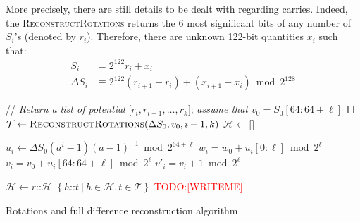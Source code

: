 \documentclass[preprint,svgnames]{iacrtrans}
\newcommand{\todo}[1]{\textcolor{red}{TODO:[#1]}}
\begin{document}
More precisely, there are still details to be dealt with regarding
carries. Indeed, the \textsc{ReconstructRotations} returns the 6 most
significant bits of any number of $S_i$'s (denoted by $r_i$). Therefore, there
are unknown 122-bit quantities $x_i$ such that:
\begin{align*}
  S_i &= 2^{122} r_i + x_i \\
  \Delta S_i &\equiv 2^{122} (r_{i+1} - r_i) + (x_{i+1} - x_{i}) \bmod 2^{128}
\end{align*}


\begin{algorithm}
\begin{algorithmic}[1]
 \State // \emph{Return a list of potential} $\texttt{[}r_i, r_{i+1}, \dots, r_k\texttt{]}$; \emph{assume that $v_0 = S_0[64:64+\ell]$}
  \State \Return \texttt{[]} 
  \EndIf
  \State $\mathcal{T} \gets \Call{ReconstructRotations}{\Delta S_0, v_0, i + 1, k}$ 
  \State $\mathcal{H} \gets \texttt{[]}$ 

  \State $u_i \gets \Delta S_0 (a^i-1)(a-1)^{-1} \bmod 2^{64+\ell}$ 
  \State $w_i = w_0 + u_i[0:\ell] \bmod 2^{\ell}$ 
  \State $v_i = v_0 + u_i[64:64+\ell] \bmod 2^{\ell}$ 
  \State $v'_i = v_i + 1 \bmod 2^{\ell}$

   
   
  \State $\mathcal{H} \gets r \texttt{::} \mathcal{H}$ 
  \EndIf
  \EndFor
  \State \Return $\left\{ h\texttt{::} t~|~ h \in \mathcal{H}, t \in \mathcal{T} \right\}$ 
  \EndFunction
  \State
  \State \todo{WRITEME}
  \EndFunction
\end{algorithmic}
\caption{Rotations and full difference reconstruction algorithm}
\end{algorithm}


\end{document}

